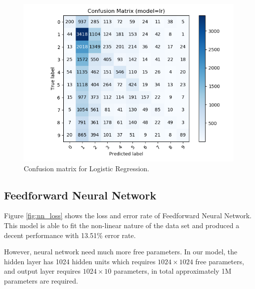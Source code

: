 \documentclass[journal]{IEEEtran}
\begin{document}
\begin{figure}[htb]
\includegraphics[width=\linewidth]{images/lr-cm.png}
\caption{Confusion matrix for Logistic Regression.}\label{fig:lr_cm}
\end{figure}

\subsection{Feedforward Neural Network}

Figure \ref{fig:nn_loss} shows the loss and error rate of Feedforward Neural Network. This model is able to fit the non-linear nature of the data set and produced a decent performance with 13.51\% error rate.

However, neural network need much more free parameters.
In our model, the hidden layer has 1024 hidden units which requires $1024 \times 1024$ free parameters, and output layer requires $1024 \times 10$ parameters, in total approximately 1M parameters are required.
\end{document}
